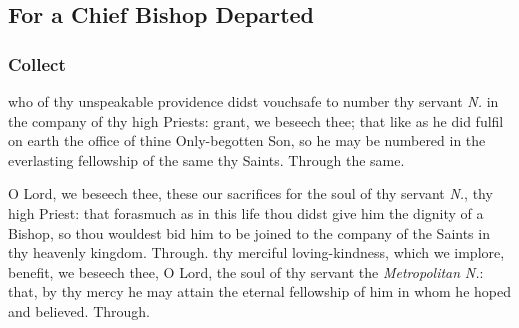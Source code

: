 \begin{multicols}{2}
\subsection{For a Chief Bishop Departed}\label{RequiemPrayers}
\subsubsection{Collect}
 who of thy unspeakable providence didst vouchsafe to number thy servant \textit{N.} in the company of thy high Priests: grant, we beseech thee; that like as he did fulfil on earth the office of thine Only-begotten Son, so he may be numbered in the everlasting fellowship of the same thy Saints. Through the same.

 O Lord, we beseech thee, these our sacrifices for the soul of thy servant \textit{N.}, thy high Priest: that forasmuch as in this life thou didst give him the dignity of a Bishop, so thou wouldest bid him to be joined to the company of the Saints in thy heavenly kingdom. Through.
 thy merciful loving-kindness, which we implore, benefit, we beseech thee, O Lord, the soul of thy servant the \textit{Metropolitan} \textit{N.}: that, by thy mercy he may attain the eternal fellowship of him in whom he hoped and believed. Through.


\end{multicols}
